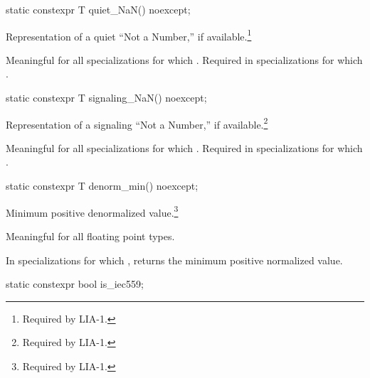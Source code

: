 \begin{itemdecl}
static constexpr T quiet_NaN() noexcept;
\end{itemdecl}

\begin{itemdescr}
\pnum
Representation of a quiet ``Not a Number,'' if available.\footnote{Required by LIA-1.}

\pnum
Meaningful for all specializations for which
.
Required in specializations for which
.
\end{itemdescr}

\begin{itemdecl}
static constexpr T signaling_NaN() noexcept;
\end{itemdecl}

\begin{itemdescr}
\pnum
Representation of a signaling ``Not a Number,'' if available.\footnote{Required by LIA-1.}

\pnum
Meaningful for all specializations for which
.
Required in specializations for which
.
\end{itemdescr}

\begin{itemdecl}
static constexpr T denorm_min() noexcept;
\end{itemdecl}

\begin{itemdescr}
\pnum
Minimum positive denormalized value.\footnote{Required by LIA-1.}

\pnum
Meaningful for all floating point types.

\pnum
In specializations for which
,
returns the minimum positive normalized value.
\end{itemdescr}

\begin{itemdecl}
static constexpr bool is_iec559;
\end{itemdecl}

